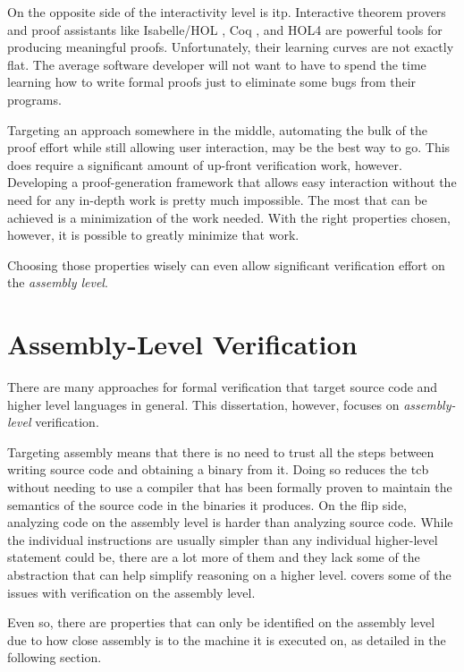 On the opposite side of the interactivity level is \ac{itp}.
Interactive theorem provers and proof assistants
like Isabelle/HOL \autocite{nipkow2002isabelle}, Coq \autocite{chlipala2013certified},
and HOL4 \autocite{slind2008brief} are powerful tools for producing meaningful proofs.
Unfortunately, their learning curves are not exactly flat.
The average software developer will not want to have to spend the time
learning how to write formal proofs just to eliminate some bugs from their programs.

Targeting an approach somewhere in the middle,
automating the bulk of the proof effort while still allowing user interaction,
may be the best way to go.
This does require a significant amount of up-front verification work, however.
Developing a proof-generation framework that allows easy interaction
without the need for any in-depth work is pretty much impossible.
The most that can be achieved is a minimization of the work needed.
With the right properties chosen, however, it is possible to greatly minimize that work.

Choosing those properties wisely can even allow significant verification effort
on the \emph{assembly level}.

\section{Assembly-Level Verification}
There are many approaches for formal verification that target source code
and higher level languages in general.
This dissertation, however, focuses on \emph{assembly-level} verification.

Targeting assembly means that there is no need to trust all the steps between
writing source code and obtaining a binary from it.
Doing so reduces the \ac{tcb} without needing to use a compiler
that has been formally proven to maintain the semantics of the source code
in the binaries it produces. On the flip side, analyzing code on the assembly level
is harder than analyzing source code.
While the individual instructions are usually simpler
than any individual higher-level statement could be,
there are a lot more of them and they lack some of the abstraction
that can help simplify reasoning on a higher level. 
covers some of the issues with verification on the assembly level.

Even so, there are properties that can only be identified on the assembly level
due to how close assembly is to the machine it is executed on,
as detailed in the following section.

